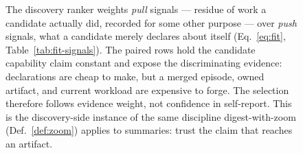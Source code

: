 \begin{figure}[H]
{%
}
\caption{The discovery ranker weights \emph{pull} signals --- residue of work a
candidate actually did, recorded for some other purpose --- over \emph{push}
signals, what a candidate merely declares about itself (Eq.~\ref{eq:fit},
Table~\ref{tab:fit-signals}). The paired rows hold the candidate capability claim
constant and expose the discriminating evidence: declarations are cheap to make,
but a merged episode, owned artifact, and current workload are expensive to forge.
The selection therefore follows evidence weight, not confidence in self-report.
This is the discovery-side instance of the same discipline digest-with-zoom
(Def.~\ref{def:zoom}) applies to summaries: trust the claim that reaches an artifact.}
\label{fig:pushpull}
\end{figure}
